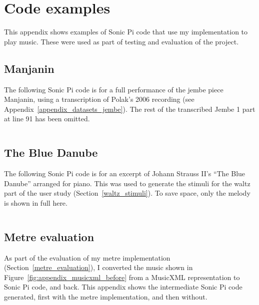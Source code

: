 \documentclass[12pt,twoside,openright]{report}
\begin{document}
\chapter{Code examples} \label{appendix_code_examples}

This appendix shows examples of Sonic Pi code that use my implementation to play music. These were used as part of testing and evaluation of the project.



\section*{Manjanin} \label{appendix_code_manjanin}

The following Sonic Pi code is for a full performance of the jembe piece Manjanin, using a transcription of Polak's 2006 recording (see Appendix~\ref{appendix_datasets_jembe}). The rest of the transcribed Jembe 1 part at line 91 has been omitted.

\inputminted[linenos=true]{ruby}{figures/manjanin_code.rb}



\section*{The Blue Danube} \label{appendix_code_blue_danube}

The following Sonic Pi code is for an excerpt of Johann Strauss II's ``The Blue Danube'' arranged for piano. This was used to generate the stimuli for the waltz part of the user study (Section~\ref{waltz_stimuli}). To save space, only the melody is shown in full here.

\begin{multicols}{2}
    \inputminted[linenos=true]{ruby}{figures/blue_danube_code.rb}
\end{multicols}



\section*{Metre evaluation} \label{appendix_code_metre_evaluation}

As part of the evaluation of my metre implementation (Section~\ref{metre_evaluation}), I converted the music shown in Figure~\ref{fig:appendix_musicxml_before} from a MusicXML representation to Sonic Pi code, and back. This appendix shows the intermediate Sonic Pi code generated, first with the metre implementation, and then without.
\end{document}
